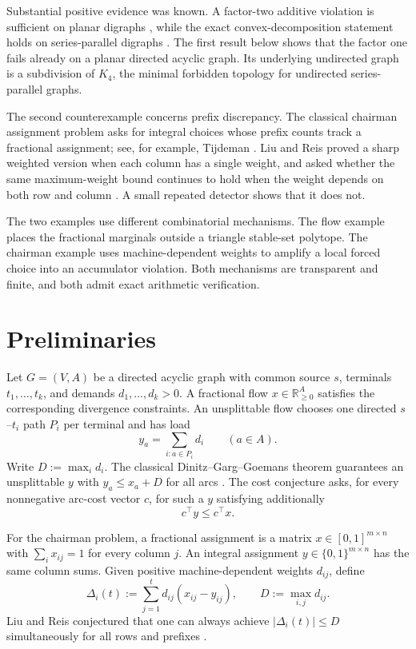 \documentclass[11pt]{article}
\theoremstyle{definition}
\newcommand{\R}{\mathbb{R}}
\begin{document}
Substantial positive evidence was known.  A factor-two additive violation is
sufficient on planar digraphs \cite{TraubVargasKochZenklusen2024}, while the
exact convex-decomposition statement holds on series-parallel digraphs
\cite{AlmoghrabiSkutellaWarode2026}.  The first result below shows that the
factor one fails already on a planar directed acyclic graph.  Its underlying
undirected graph is a subdivision of $K_4$, the minimal forbidden topology for
undirected series-parallel graphs.

The second counterexample concerns prefix discrepancy.  The classical
chairman assignment problem asks for integral choices whose prefix counts
track a fractional assignment; see, for example, Tijdeman
\cite{Tijdeman1980}.  Liu and Reis proved a sharp weighted version when each
column has a single weight, and asked whether the same maximum-weight bound
continues to hold when the weight depends on both row and column
\cite{LiuReis2026}.  A small repeated detector shows that it does not.

The two examples use different combinatorial mechanisms.  The flow example
places the fractional marginals outside a triangle stable-set polytope.  The
chairman example uses machine-dependent weights to amplify a local forced
choice into an accumulator violation.  Both mechanisms are transparent and
finite, and both admit exact arithmetic verification.

\section{Preliminaries}

Let $G=(V,A)$ be a directed acyclic graph with common source $s$, terminals
$t_1,\dots,t_k$, and demands $d_1,\dots,d_k>0$.  A fractional flow
$x\in\R_{\ge0}^{A}$ satisfies the corresponding divergence constraints.  An
unsplittable flow chooses one directed $s$--$t_i$ path $P_i$ per terminal and
has load
\[
 y_a=\sum_{i:a\in P_i} d_i \qquad (a\in A).
\]
Write $D:=\max_i d_i$.  The classical Dinitz--Garg--Goemans theorem guarantees
an unsplittable $y$ with $y_a\le x_a+D$ for all arcs
\cite{DinitzGargGoemans1999}.  The cost conjecture asks, for every nonnegative
arc-cost vector $c$, for such a $y$ satisfying additionally
\[
 c^\top y\le c^\top x.                                           \tag{1}
\]

For the chairman problem, a fractional assignment is a matrix
$x\in[0,1]^{m\times n}$ with $\sum_i x_{ij}=1$ for every column $j$.  An
integral assignment $y\in\{0,1\}^{m\times n}$ has the same column sums.  Given
positive machine-dependent weights $d_{ij}$, define
\[
 \Delta_i(t):=\sum_{j=1}^{t}d_{ij}(x_{ij}-y_{ij}),
 \qquad
 D:=\max_{i,j}d_{ij}.
\]
Liu and Reis conjectured that one can always achieve
$|\Delta_i(t)|\le D$ simultaneously for all rows and prefixes
\cite[Conjecture~19]{LiuReis2026}.
\end{document}
